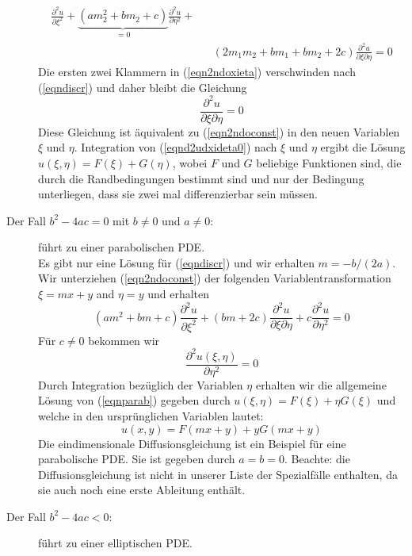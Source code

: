 \begin{description}
\begin{eqnarray}
{			\frac{\partial^2 u}{\partial\xi^2}+
			\underbrace{\left(am_2^2+bm_2+c\right)}_{=0}
			\frac{\partial^2 u}{\partial\eta^2}+
			}\nonumber\\[1ex]
			&&\left(2m_1m_2+bm_1+bm_2+2c\right)\frac{\partial^2 u}{\partial\xi\partial\eta}=0
			\label{eqn2ndoxieta}
		\end{eqnarray}
		Die ersten zwei Klammern in (\ref{eqn2ndoxieta}) verschwinden
		nach (\ref{eqndiscr}) und daher bleibt die Gleichung
		\begin{equation}
			\frac{\partial^2 u}{\partial\xi\partial\eta}=0
			\label{eqnd2udxideta0}
		\end{equation}
		Diese Gleichung ist äquivalent zu (\ref{eqn2ndoconst}) in den neuen Variablen
		$\xi$ und $\eta$. Integration von (\ref{eqnd2udxideta0}) nach $\xi$ und $\eta$ ergibt
		die Lösung $u(\xi,\eta)=F(\xi)+G(\eta)$, wobei $F$ und $G$
		beliebige Funktionen sind, die durch die Randbedingungen
		bestimmt sind und nur der Bedingung unterliegen, dass sie zwei
		mal differenzierbar sein müssen.
	\item[Der Fall $b^2-4ac=0$ mit $b\ne 0$ und $a\ne 0$:] führt zu einer parabolischen PDE.\\
		Es gibt nur eine Lösung für (\ref{eqndiscr}) und wir erhalten
		$m=-b/(2a)$. Wir unterziehen (\ref{eqn2ndoconst}) der folgenden
		Variablentransformation $\xi=m x + y$ and $\eta=y$ und erhalten
		\begin{equation}
			\left(am^2+bm+c\right)\frac{\partial^2 u}{\partial\xi^2}+
			(bm+2c)\frac{\partial^2 u}{\partial\xi\partial\eta}+
			c\frac{\partial^2 u}{\partial\eta^2}=0
			\label{eqntranfparab}
		\end{equation}
		Für $c\ne 0$ bekommen wir
		\begin{equation}
			\frac{\partial^2 u(\xi,\eta)}{\partial\eta^2}=0
			\label{eqnparab}
		\end{equation}
		Durch Integration bezüglich der Variablen $\eta$ erhalten
		wir die allgemeine Lösung von (\ref{eqnparab}) gegeben durch
		$u(\xi,\eta)=F(\xi)+\eta G(\xi)$ und welche in den ursprünglichen
		Variablen lautet:
		\begin{equation}
			u(x,y)=F(mx+y)+yG(mx+y)
			\label{eqnsolgenparab}
		\end{equation}
		Die eindimensionale Diffusionsgleichung ist ein Beispiel für
		eine parabolische PDE. Sie ist gegeben durch
		$a=b=0$. Beachte: die Diffusionsgleichung ist nicht in unserer
		Liste der Spezialfälle enthalten, da sie auch noch eine erste
		Ableitung enthält.
	\item[Der Fall $b^2-4ac<0$:] führt zu einer elliptischen PDE.\\

\end{description}

